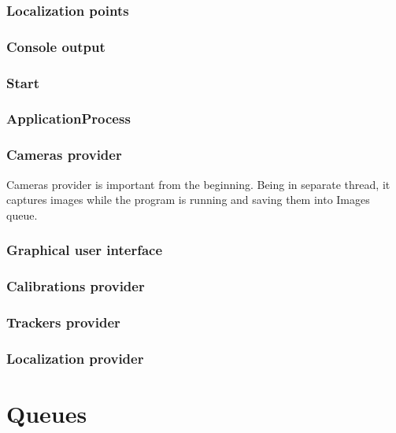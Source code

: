 \subsubsection{Localization points}

\subsubsection{Console output}


\subsubsection*{Start}




\subsubsection*{ApplicationProcess}



\subsubsection*{Cameras provider}

Cameras provider is important from the beginning. Being in separate thread, it captures images while the program is running and saving them into Images queue. 


\subsubsection*{Graphical user interface}




\subsubsection*{Calibrations provider}



\subsubsection*{Trackers provider}



\subsubsection*{Localization provider}

\section{Queues}

